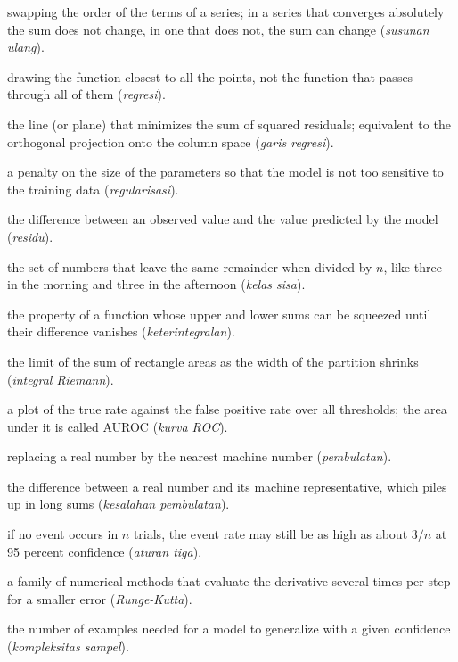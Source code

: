 \begin{description}[style=nextline,itemsep=0.35em]
  \item[Rearrangement] swapping the order of the terms of a series; in a series that converges absolutely the sum does not change, in one that does not, the sum can change (\emph{susunan ulang}).
  \item[Regression] drawing the function closest to all the points, not the function that passes through all of them (\emph{regresi}).
  \item[Regression line] the line (or plane) that minimizes the sum of squared residuals; equivalent to the orthogonal projection onto the column space (\emph{garis regresi}).
  \item[Regularization] a penalty on the size of the parameters so that the model is not too sensitive to the training data (\emph{regularisasi}).
  \item[Residual] the difference between an observed value and the value predicted by the model (\emph{residu}).
  \item[Residue class] the set of numbers that leave the same remainder when divided by $n$, like three in the morning and three in the afternoon (\emph{kelas sisa}).
  \item[Riemann integrability] the property of a function whose upper and lower sums can be squeezed until their difference vanishes (\emph{keterintegralan}).
  \item[Riemann integral] the limit of the sum of rectangle areas as the width of the partition shrinks (\emph{integral Riemann}).
  \item[ROC curve] a plot of the true rate against the false positive rate over all thresholds; the area under it is called AUROC (\emph{kurva ROC}).
  \item[Rounding] replacing a real number by the nearest machine number (\emph{pembulatan}).
  \item[Rounding error] the difference between a real number and its machine representative, which piles up in long sums (\emph{kesalahan pembulatan}).
  \item[Rule of three] if no event occurs in $n$ trials, the event rate may still be as high as about $3/n$ at 95 percent confidence (\emph{aturan tiga}).
  \item[Runge-Kutta] a family of numerical methods that evaluate the derivative several times per step for a smaller error (\emph{Runge-Kutta}).
  \item[Sample complexity] the number of examples needed for a model to generalize with a given confidence (\emph{kompleksitas sampel}).

\end{description}
